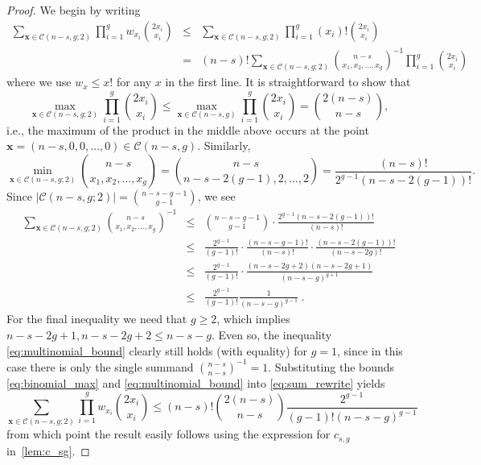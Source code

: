 \documentclass[11pt]{article}
\theoremstyle{definition}
\theoremstyle{remark}
\theoremstyle{remark}
\numberwithin{theorem}{section}
\begin{document}
\begin{proof}
    We begin by writing 
	\begin{eqnarray}\label{eq:sum_rewrite}
            \sum_{\bm{x} \in \mathcal{C}(n-s,g;2)}\prod_{i=1}^{g}w_{x_{i}}\binom{2x_{i}}{x_{i}} &\leq& \sum_{\bm{x} \in \mathcal{C}(n-s,g;2)}\prod_{i=1}^{g}(x_{i})!\binom{2x_{i}}{x_{i}}\nonumber\\
            &=&(n-s)!\sum_{\bm{x} \in \mathcal{C}(n-s,g;2)}\binom{n-s}{x_{1},x_{2},\dots,x_{g}}^{-1} \prod_{i=1}^{g}\binom{2x_{i}}{x_{i}}
	\end{eqnarray}
	where we use $w_{x} \leq x!$ for any $x$ in the first line. It is straightforward to show that 
	\begin{equation}\label{eq:binomial_max}
            \max_{\bm{x} \in \mathcal{C}(n-s,g;2)}\prod_{i=1}^{g}\binom{2x_{i}}{x_{i}} \leq \max_{\bm{x} \in \mathcal{C}(n-s,g)}\prod_{i=1}^{g}\binom{2x_{i}}{x_{i}} = \binom{2(n-s)}{n-s},
	\end{equation}
	i.e., the maximum of the product in the middle above occurs at the point $\bm{x} = (n-s,0,0,\dots,0) \in \mathcal{C}(n-s,g)$. Similarly, 
	$$
            \min_{\bm{x} \in \mathcal{C}(n-s,g;2)}\binom{n-s}{x_{1},x_{2},\dots,x_{g}} = \binom{n-s}{n-s-2(g-1),2,\dots,2} = \frac{(n-s)!}{2^{g-1}(n-s-2(g-1))!}.
	$$
	Since $|\mathcal{C}(n-s,g;2)| = \binom{n-s-g-1}{g-1}$, we see
	\begin{eqnarray}\label{eq:multinomial_bound}
            \sum_{\bm{x} \in \mathcal{C}(n-s,g;2)}\binom{n-s}{x_{1},x_{2},\dots,x_{g}}^{-1} &\leq& \binom{n-s-g-1}{g-1} \cdot \frac{2^{g-1}(n-s-2(g-1))!}{(n-s)!}\nonumber\\
            &\leq& \frac{2^{g-1}}{(g-1)!} \cdot \frac{(n-s-g-1)!}{(n-s)!}\cdot\frac{(n-s-2(g-1))!}{(n-s-2g)!} \nonumber\\
            &\leq& \frac{2^{g-1}}{(g-1)!}\cdot\frac{(n-s-2g+2)(n-s-2g+1)}{(n-s-g)^{g+1}}\nonumber\\
            &\leq& \frac{2^{g-1}}{(g-1)!}\frac{1}{(n-s-g)^{g-1}} \ .
	\end{eqnarray}
	For the final inequality we need that $g \geq 2$, which implies $n-s-2g+1, n-s-2g+2 \leq n-s-g$. Even so, the inequality \eqref{eq:multinomial_bound} clearly still holds (with equality) for $g =1$, since in this case there is only the single summand $\binom{n-s}{n-s}^{-1} = 1$. Substituting the bounds \eqref{eq:binomial_max} and \eqref{eq:multinomial_bound} into \eqref{eq:sum_rewrite} yields 
	$$
            \sum_{\bm{x} \in \mathcal{C}(n-s,g;2)}\prod_{i=1}^{g}w_{x_{i}}\binom{2x_{i}}{x_{i}} \leq (n-s)!\binom{2(n-s)}{n-s}\frac{2^{g-1}}{(g-1)!(n-s-g)^{g-1}}
	$$
	from which point the result easily follows using the expression for $c_{s,g}$ in~\cref{lem:c_sg}.
\end{proof}
\end{document}
